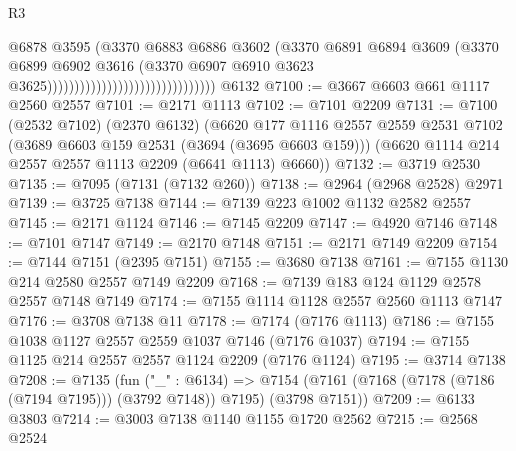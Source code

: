 \begin{lexlean}{R3}
\begin{coremodule}
                                                          @6878
                                                          @3595
                                                          (@3370
                                                            @6883
                                                            @6886
                                                            @3602
                                                            (@3370
                                                              @6891
                                                              @6894
                                                              @3609
                                                              (@3370
                                                                @6899
                                                                @6902
                                                                @3616
                                                                (@3370
                                                                  @6907
                                                                  @6910
                                                                  @3623
                                                                  @3625)))))))))))))))))))))))))))))))
    @6132
@7100 := @3667 @6603 @661 @1117 @2560 @2557
@7101 := @2171 @1113
@7102 := @7101 @2209
@7131 := @7100
    (@2532 @7102)
    (@2370 @6132)
    (@6620
      @177
      @1116
      @2557
      @2559
      @2531
      @7102
      (@3689 @6603 @159 @2531 (@3694 (@3695 @6603 @159)))
      (@6620 @1114 @214 @2557 @2557 @1113 @2209 (@6641 @1113) @6660))
@7132 := @3719 @2530
@7135 := @7095 (@7131 (@7132 @260))
@7138 := @2964 (@2968 @2528) @2971
@7139 := @3725 @7138
@7144 := @7139 @223 @1002 @1132 @2582 @2557
@7145 := @2171 @1124
@7146 := @7145 @2209
@7147 := @4920 @7146
@7148 := @7101 @7147
@7149 := @2170 @7148
@7151 := @2171 @7149 @2209
@7154 := @7144 @7151 (@2395 @7151)
@7155 := @3680 @7138
@7161 := @7155 @1130 @214 @2580 @2557 @7149 @2209
@7168 := @7139 @183 @124 @1129 @2578 @2557 @7148 @7149
@7174 := @7155 @1114 @1128 @2557 @2560 @1113 @7147
@7176 := @3708 @7138 @11
@7178 := @7174 (@7176 @1113)
@7186 := @7155 @1038 @1127 @2557 @2559 @1037 @7146 (@7176 @1037)
@7194 := @7155 @1125 @214 @2557 @2557 @1124 @2209 (@7176 @1124)
@7195 := @3714 @7138
@7208 := @7135
    (fun ("_" : @6134) =>
    @7154 (@7161 (@7168 (@7178 (@7186 (@7194 @7195))) (@3792 @7148)) @7195) (@3798 @7151))
@7209 := @6133 @3803
@7214 := @3003 @7138 @1140 @1155 @1720 @2562
@7215 := @2568 @2524

\end{coremodule}
\end{lexlean}
